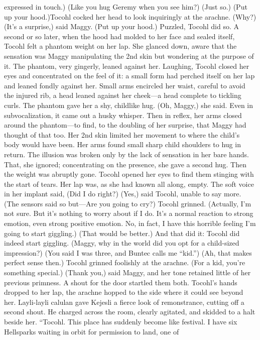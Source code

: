 \documentclass[9pt]{article}
\begin{document}
expressed in touch.)
(Like you hug Geremy when you see him?)
(Just so.)
(Put up your hood.)Tocohl cocked her head to look inquiringly at the arachne. (Why?)
(It’s a surprise,) said Maggy. (Put up your hood.)
Puzzled, Tocohl did so. A second or so later, when the hood had molded to her face and sealed
itself, Tocohl felt a phantom weight on her lap. She glanced down, aware that the sensation was Maggy
manipulating the 2nd skin but wondering at the purpose of it. The phantom, very gingerly, leaned against
her.
Laughing, Tocohl closed her eyes and concentrated on the feel of it: a small form had perched itself
on her lap and leaned fondly against her. Small arms encircled her waist, careful to avoid the injured rib, a
head leaned against her cheek—a head complete to tickling curls. The phantom gave her a shy, childlike
hug.
(Oh, Maggy,) she said. Even in subvocalization, it came out a husky whisper. Then in reflex, her arms
closed around the phantom—to find, to the doubling of her surprise, that Maggy had thought of that too.
Her 2nd skin limited her movement to where the child’s body would have been. Her arms found small
sharp child shoulders to hug in return. The illusion was broken only by the lack of sensation in her bare
hands. That, she ignored; concentrating on the presence, she gave a second hug.
Then the weight was abruptly gone. Tocohl opened her eyes to find them stinging with the start of
tears. Her lap was, as she had known all along, empty.
The soft voice in her implant said, (Did I do right?)
(Yes,) said Tocohl, unable to say more.
(The sensors said so but—Are you going to cry?)
Tocohl grinned. (Actually, I’m not sure. But it’s nothing to worry about if I do. It’s a normal reaction
to strong emotion, even strong positive emotion. No, in fact, I have this horrible feeling I’m going to start
giggling.)
(That would be better.)
And that did it: Tocohl did indeed start giggling. (Maggy, why in the world did you opt for a
child-sized impression?)
(You said I was three, and Buntec calls me “kid.”)
(Ah, that makes perfect sense then.) Tocohl grinned foolishly at the arachne. (For a kid, you’re
something special.)
(Thank you,) said Maggy, and her tone retained little of her previous primness.
A shout for the door startled them both. Tocohl’s hands dropped to her lap, the arachne hopped to
the side where it could see beyond her. Layli-layli calulan gave Kejesli a fierce look of remonstrance,
cutting off a second shout.
He charged across the room, clearly agitated, and skidded to a halt beside her. “Tocohl. This place
has suddenly become like festival. I have six Hellsparks waiting in orbit for permission to land, one of
\end{document}
